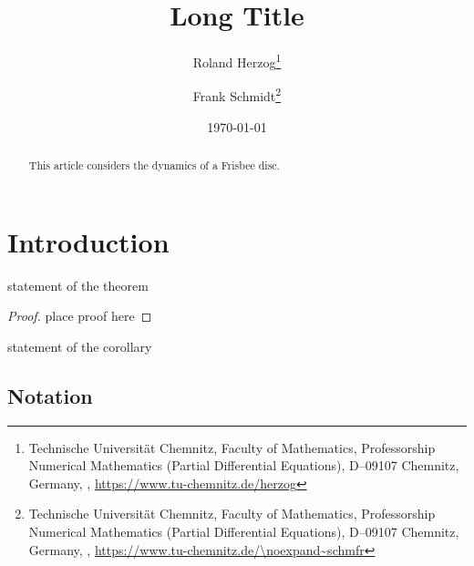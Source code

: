 \documentclass[english,framed_theorems]{numapde_preprint}
\begin{document}
\title[Short Title]{Long Title}
\subtitle{}
\author[Herzog, Schmidt]{Roland Herzog\footnote{Technische Universität Chemnitz, Faculty of Mathematics, Professorship Numerical Mathematics (Partial Differential Equations), D--09107 Chemnitz, Germany, , \url{https://www.tu-chemnitz.de/herzog}} \and Frank Schmidt\footnote{Technische Universität Chemnitz, Faculty of Mathematics, Professorship Numerical Mathematics (Partial Differential Equations), D--09107 Chemnitz, Germany, , \url{https://www.tu-chemnitz.de/\noexpand~schmfr}}}
\date{\today}
\publishers{}
\dedication{}
\maketitle
\thispagestyle{empty}

\begin{abstract}
	This article considers the dynamics of a Frisbee disc.
\end{abstract}

\section{Introduction}
\label{sec:Introduction}

\begin{theorem}
	\label{theorem:first_theorem}
	statement of the theorem
\end{theorem}
\begin{proof}
	place proof here
\end{proof}

\begin{corollary}
	\label{corollary:first_theorem}
	statement of the corollary
\end{corollary}

\subsection{Notation}
\label{subsec:Notation}


% 
% 
\end{document}
